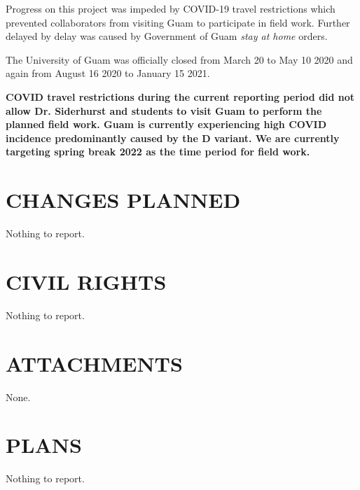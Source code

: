 \documentclass[12pt,letterpaper,english,bibliography=totocnumbered,abstract=on]{scrartcl}
\begin{document}
Progress on this project was impeded by COVID-19 travel restrictions which prevented collaborators from visiting Guam to participate in field work. Further delayed by delay was caused by Government of Guam \textit{stay at home} orders. 

The University of Guam was officially closed from March 20 to May 10 2020 and again from August 16 2020 to January 15 2021.

\textbf{COVID travel restrictions during the current reporting period did not allow Dr. Siderhurst and students to visit Guam to perform the planned field work. Guam is currently experiencing high COVID incidence predominantly caused by the D variant. We are currently targeting spring break 2022 as the time period for field work.}

\section{CHANGES PLANNED}


Nothing to report.

\section{CIVIL RIGHTS}


Nothing to report.

\section{ATTACHMENTS}


None.

\section{PLANS}


Nothing to report.
\end{document}
